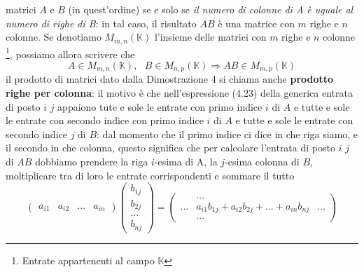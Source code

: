\documentclass{book}
\begin{document}
matrici $A$ e $B$ (in quest'ordine) se e solo se \textit{il numero di colonne di A è uguale al
  numero di righe di B}: in tal caso, il risultato $AB$ è una matrice con $m$ righe e $n$
colonne. Se denotiamo $M_{m,n}(\mathbb{K})$ l'insieme delle matrici con $m$ righe e $n$ colonne
\footnote{Entrate appartenenti al campo $\mathbb{K}$}, possiamo allora scrivere che
\begin{equation*}
  A\in M_{m,n}(\mathbb{K}),\text{ }B\in M_{n,p}(\mathbb{K})\Rightarrow AB\in M_{m,p}(\mathbb{K})
\end{equation*}
il prodotto di matrici dato dalla Dimostrazione 4 si chiama anche \textbf{prodotto righe per
  colonna}: il motivo è che nell'espressione (4.23) della generica entrata di posto $i$ $j$
appaiono tute e sole le entrate con primo indice $i$ di $A$ e tutte e sole le entrate con
secondo indice con primo indice $i$ di $A$ e tutte e sole le entrate con secondo indice $j$ di
$B$: dal momento che il primo indice ci dice in che riga siamo, e il secondo in che colonna,
questo significa che per calcolare l'entrata di posto $i$ $j$ di $AB$ dobbiamo prendere la riga
$i$-esima di A, la $j$-esima colonna di $B$, moltiplicare tra di loro le entrate corrispondenti e
sommare il tutto
\begin{equation*}
  \begin{pmatrix}
    a_{i1} & a_{i2} &\dots & a_{in}
  \end{pmatrix}
  \begin{pmatrix}
    b_{1j}\\
    b_{2j}\\
    \dots\\
    b_{nj}
  \end{pmatrix}=
  \begin{pmatrix}
    &\dots\\
    \dots & a_{i1}b_{1j}+a_{i2}b_{2j}+\dots+a_{in}b_{nj} &\dots\\
    &\dots
  \end{pmatrix}
\end{equation*}
\end{document}
